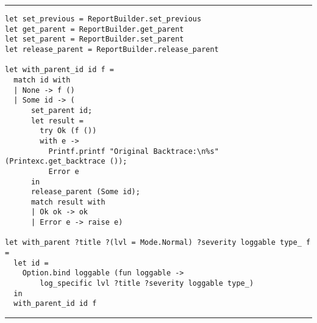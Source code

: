 \vspace{2em}
\noindent\rule{\textwidth}{0.5pt}
\vspace{-0.6cm}
\begin{verbatim}
let set_previous = ReportBuilder.set_previous
let get_parent = ReportBuilder.get_parent
let set_parent = ReportBuilder.set_parent
let release_parent = ReportBuilder.release_parent

let with_parent_id id f =
  match id with
  | None -> f ()
  | Some id -> (
      set_parent id;
      let result =
        try Ok (f ())
        with e ->
          Printf.printf "Original Backtrace:\n%s" (Printexc.get_backtrace ());
          Error e
      in
      release_parent (Some id);
      match result with
      | Ok ok -> ok
      | Error e -> raise e)

let with_parent ?title ?(lvl = Mode.Normal) ?severity loggable type_ f =
  let id =
    Option.bind loggable (fun loggable ->
        log_specific lvl ?title ?severity loggable type_)
  in
  with_parent_id id f
\end{verbatim}
\vspace{-0.4cm}
\noindent\rule{\textwidth}{0.5pt}
\vspace{-0.6cm}
%
\label{lst:logging-parent-previous}

